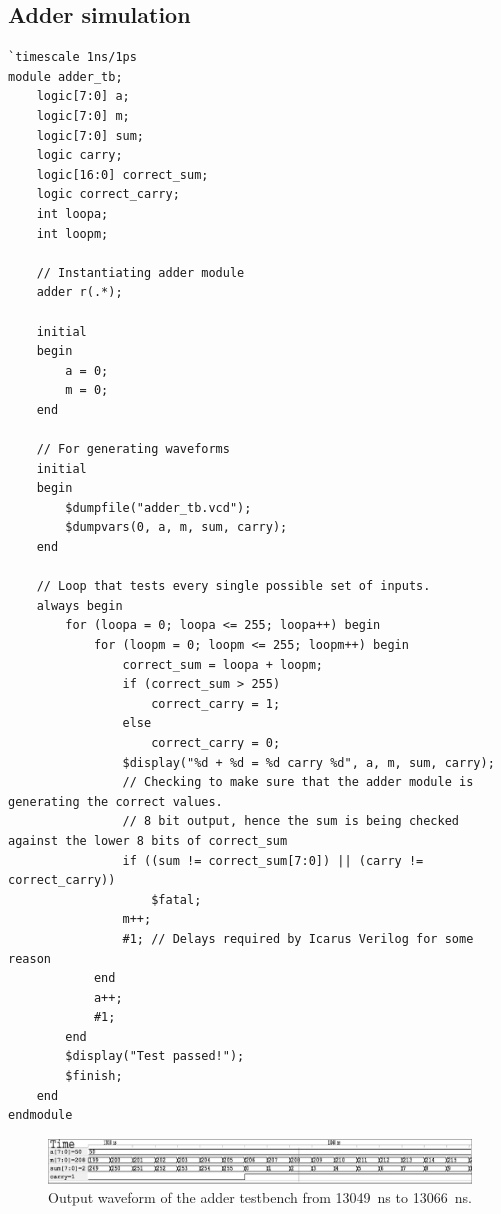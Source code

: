 \documentclass[a4paper,11pt]{article}
\begin{document}
\subsection{Adder simulation}
\linespread{0.8}
\begin{lstlisting}
`timescale 1ns/1ps
module adder_tb;
    logic[7:0] a;
    logic[7:0] m;
    logic[7:0] sum;
    logic carry;
    logic[16:0] correct_sum;
    logic correct_carry;
    int loopa;
    int loopm;
    
    // Instantiating adder module
    adder r(.*); 
    
    initial
    begin
        a = 0;
        m = 0;
    end
    
    // For generating waveforms
    initial
    begin
        $dumpfile("adder_tb.vcd");
        $dumpvars(0, a, m, sum, carry);
    end
    
    // Loop that tests every single possible set of inputs.
    always begin
        for (loopa = 0; loopa <= 255; loopa++) begin
            for (loopm = 0; loopm <= 255; loopm++) begin
                correct_sum = loopa + loopm;
                if (correct_sum > 255)
                    correct_carry = 1;
                else
                    correct_carry = 0;                    
                $display("%d + %d = %d carry %d", a, m, sum, carry);
                // Checking to make sure that the adder module is generating the correct values.
                // 8 bit output, hence the sum is being checked against the lower 8 bits of correct_sum
                if ((sum != correct_sum[7:0]) || (carry != correct_carry))
                    $fatal;
                m++;
                #1; // Delays required by Icarus Verilog for some reason
            end
            a++;
            #1;
        end        
        $display("Test passed!");
        $finish;
    end
endmodule
\end{lstlisting}

\begin{figure}[H]
    \centering
        \includegraphics[scale=0.65]{../out/adder_tb.eps}
    \caption{Output waveform of the adder testbench from \SI{13049}{\nano\second} to \SI{13066}{\nano\second}.}
    \label{fig:addertbw}
\end{figure}
\end{document}

